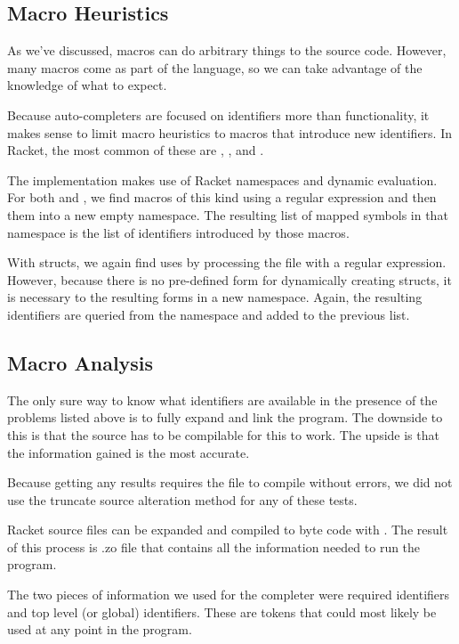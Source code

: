 \documentclass[ms,electronic,twosidetoc,letterpaper,chaptercenter,parttop,lol,lof,lot]{byumsphd}
\begin{document}
\subsection{Macro Heuristics}

As we've discussed, macros can do arbitrary things to the source code. However, many
macros come as part of the language, so we can take advantage of the knowledge of what to
expect.

Because auto-completers are focused on identifiers more than functionality, it makes sense
to limit macro heuristics to macros that introduce new identifiers. In Racket, the most
common of these are , , and .

The implementation makes use of Racket namespaces and dynamic evaluation. For both
 and , we find macros of this kind using a regular
expression and then  them into a new empty namespace. The
resulting list of mapped symbols in that namespace is the list of identifiers introduced
by those macros.

With structs, we again find uses by processing the file with a regular expression.
However, because there is no pre-defined form for dynamically creating structs, it is
necessary to  the resulting forms in a new namespace. Again, the resulting
identifiers are queried from the namespace and added to the previous list.

\subsection{Macro Analysis}

The only sure way to know what identifiers are available in the presence of the problems
listed above is to fully expand and link the program. The downside to this is that the
source has to be compilable for this to work. The upside is that the information gained is
the most accurate.

Because getting any results requires the file to compile without errors, we did not use
the truncate source alteration method for any of these tests.

Racket source files can be expanded and compiled to byte code with . The
result of this process is .zo file that contains all the information needed to run the
program.

The two pieces of information we used for the completer were required identifiers and top
level (or global) identifiers. These are tokens that could most likely be used at any
point in the program.
\end{document}
